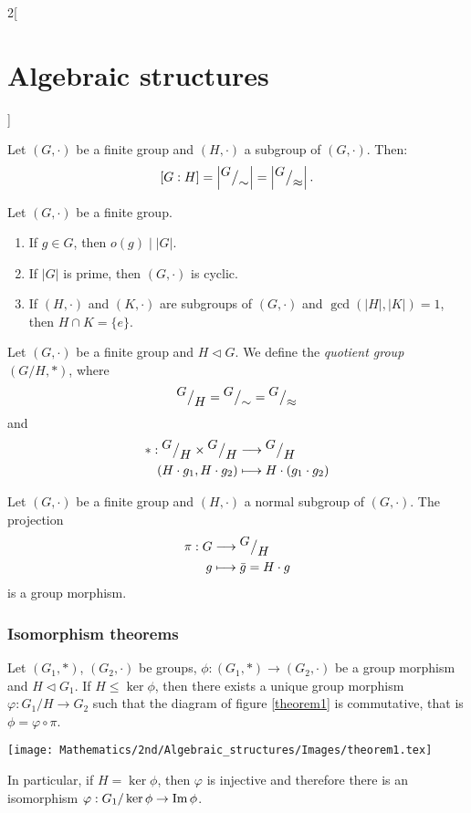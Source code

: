 \documentclass[class=article,10pt,crop=false]{standalone}
\begin{document}
\begin{multicols}{2}[\section{Algebraic structures}]
\begin{definition}
\end{definition}
\begin{corollary}
Let $(G,\cdot)$ be a finite group and $(H,\cdot)$ a subgroup of $(G,\cdot)$. Then: $$[G:H]=\left|{^{\textstyle G}\big/_{\textstyle \sim}}\right|=\left|{^{\textstyle G}\big/_{\textstyle \approx}}\right|.$$
\end{corollary}
\begin{corollary}
Let $(G,\cdot)$ be a finite group. 
\begin{enumerate}
    \item If $g\in G$, then $o(g)\mid |G|$.
    \item If $|G|$ is prime, then $(G,\cdot)$ is cyclic.
    \item If $(H,\cdot)$ and $(K,\cdot)$ are subgroups of $(G,\cdot)$ and $\gcd(|H|,|K|)=1$, then $H\cap K=\{e\}$.
\end{enumerate}
\end{corollary}
\begin{definition}
Let $(G,\cdot)$ be a finite group and $H\lhd G$. We define the \textit{quotient group $\left(G/H,*\right)$}, where $${^{\textstyle G}\big/_{\textstyle H}}={^{\textstyle G}\big/_{\textstyle \sim}}={^{\textstyle G}\big/_{\textstyle \approx}}$$ and 
\begin{align*}
    *:{^{\textstyle G}\big/_{\textstyle H}}\times{^{\textstyle G}\big/_{\textstyle H}}&\longrightarrow{^{\textstyle G}\big/_{\textstyle H}}\\
    (H\cdot g_1,H\cdot g_2)&\longmapsto H\cdot (g_1\cdot g_2)
\end{align*}
\end{definition}
\begin{lemma}
Let $(G,\cdot)$ be a finite group and $(H,\cdot)$ a normal subgroup of $(G,\cdot)$. The projection 
\begin{align*}
    \pi:G&\longrightarrow{^{\textstyle G}\big/_{\textstyle H}}\\
    g&\longmapsto\Bar{g}=H\cdot g
\end{align*}
is a group morphism.
\end{lemma}
\subsubsection*{Isomorphism theorems}
\begin{theorem}
Let $(G_1,*)$, $(G_2,\cdot)$ be groups, $\phi:(G_1,*)\rightarrow(G_2,\cdot)$ be a group morphism and $H\lhd G_1$. If $H\leq\ker\phi$, then there exists a unique group morphism $\varphi:G_1/H\rightarrow G_2$ such that the diagram of figure \ref{theorem1} is commutative, that is $\phi=\varphi\circ\pi$.\par
\begin{minipage}{\linewidth}
    \centering
    \texttt{[image: Mathematics/2nd/Algebraic\_structures/Images/theorem1.tex]} 
    \label{theorem1}
\end{minipage}
In particular, if $H=\ker\phi$, then $\varphi$ is injective and therefore there is an isomorphism $\varphi:G_1/\ker\phi\rightarrow\operatorname{Im}\phi$.
\end{theorem}
\end{multicols}
\end{document}
